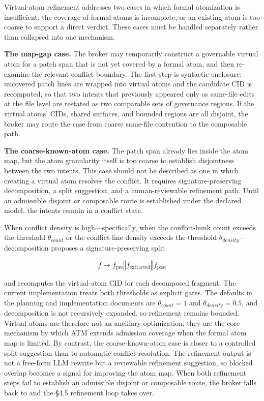 \documentclass[9pt,letterpaper]{extarticle}
\begin{document}
Virtual-atom refinement addresses two cases in which formal atomization is insufficient: the coverage of formal atoms is incomplete, or an existing atom is too coarse to support a direct verdict. These cases must be handled separately rather than collapsed into one mechanism.

\textbf{The map-gap case.} The broker may temporarily construct a governable virtual atom for a patch span that is not yet covered by a formal atom, and then re-examine the relevant conflict boundary. The first step is syntactic enclosure: uncovered patch lines are wrapped into virtual atoms and the candidate CID is recomputed, so that two intents that previously appeared only as same-file edits at the file level are restated as two comparable sets of governance regions. If the virtual atoms' CIDs, shared surfaces, and bounded regions are all disjoint, the broker may route the case from coarse same-file contention to the composable \texttt{} path.

\textbf{The coarse-known-atom case.} The patch span already lies inside the atom map, but the atom granularity itself is too coarse to establish disjointness between the two intents. This case should not be described as one in which {}creating a virtual atom resolves the conflict.{} It requires signature-preserving decomposition, a split suggestion, and a human-reviewable refinement path. Until an admissible disjoint or composable route is established under the declared model, the intents remain in a conflict state.

When conflict density is high---specifically, when the conflict-hunk count exceeds the threshold $\theta_{count}$ or the conflict-line density exceeds the threshold $\theta_{density}$---decomposition proposes a signature-preserving split

\[
f \mapsto f_{\mathrm{pre}} \mathbin{\Vert} f_{\mathrm{extracted}} \mathbin{\Vert} f_{\mathrm{post}}
\]

and recomputes the virtual-atom CID for each decomposed fragment. The current implementation treats both thresholds as explicit gates. The defaults in the planning and implementation documents are $\theta_{count} = 1$ and $\theta_{density} = 0.5$, and decomposition is not recursively expanded, so refinement remains bounded. Virtual atoms are therefore not an ancillary optimization; they are the core mechanism by which ATM extends admission coverage when the formal atom map is limited. By contrast, the coarse-known-atom case is closer to a controlled split suggestion than to automatic conflict resolution. The refinement output is not a free-form LLM rewrite but a reviewable refinement suggestion, so blocked overlap becomes a signal for improving the atom map. When both refinement steps fail to establish an admissible disjoint or composable route, the broker falls back to \texttt{} and the §4.5 refinement loop takes over.
\end{document}
